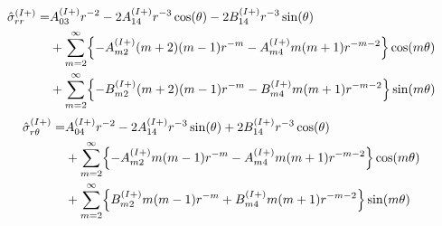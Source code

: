 \begin{align}
	\hat{\sigma}_{rr}^{(I+)} =&A_{03}^{(I+)}r^{-2}
	-2A_{14}^{(I+)}r^{-3}\cos(\theta)
	-2B_{14}^{(I+)}r^{-3}\sin(\theta)
	\nonumber
	\\
	&+\sum_{m=2}^{\infty}\Bigl\{
	-A_{m2}^{(I+)}(m+2)(m-1)r^{-m}
	-A_{m4}^{(I+)}m(m+1)r^{-m-2}\Bigr\}\cos(m\theta)
	\nonumber
	\\
	&+\sum_{m=2}^{\infty}\Bigl\{
	-B_{m2}^{(I+)}(m+2)(m-1)r^{-m}
	-B_{m4}^{(I+)}m(m+1)r^{-m-2}\Bigr\}\sin(m\theta)
	\label{eq:SigmaRROut1}
\end{align}
\begin{align}
	\hat{\sigma}_{r\theta}^{(I+)} =&A_{04}^{(I+)}r^{-2}
	-2A_{14}^{(I+)}r^{-3}\sin(\theta)
	+2B_{14}^{(I+)}r^{-3}\cos(\theta)
	\nonumber
	\\
	&+\sum_{m=2}^{\infty}\Bigl\{
	-A_{m2}^{(I+)}m(m-1)r^{-m}
	-A_{m4}^{(I+)}m(m+1)r^{-m-2}\Bigr\}\cos(m\theta)
	\nonumber
	\\
	&+\sum_{m=2}^{\infty}\Bigl\{
	B_{m2}^{(I+)}m(m-1)r^{-m}
	+B_{m4}^{(I+)}m(m+1)r^{-m-2}\Bigr\}\sin(m\theta)
	\label{eq:SigmaRThOut1}
\end{align}

\newpage
